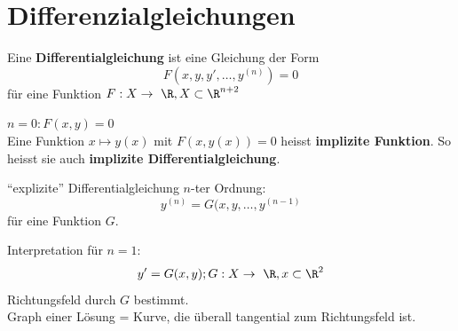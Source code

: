 \chapter{Differenzialgleichungen}
\begin{def*}[note = gewönliche Differentialgleichung $n$ter Ordnung , index = gewöhnliche Differentialgleichung , indexformat = {2!1~}]
	Eine \textbf{Differentialgleichung} ist eine Gleichung der Form
	\[ F( x , y , y' , \dotsc , y^{(n)} ) = 0 \]
	für eine Funktion $F : X \rightarrow \R , X \subset \R^{n+2}$
	
	$n=0 : F(x,y) = 0$ \\
	Eine Funktion $x \mapsto y(x)$ mit $F(x,y(x)) = 0$ heisst \textbf{implizite Funktion}. So heisst sie auch \textbf{implizite Differentialgleichung}.
	
	\enquote{explizite} Differentialgleichung $n$-ter Ordnung:
	\[ y^(n) = G( x , y , \dotsc , y^{(n-1)} \]
	für eine Funktion $G$.
\end{def*}
Interpretation für $n=1$: \\
\[ y' = G(x,y) ; G : X \rightarrow \R , x \subset \R^2 \]
Richtungsfeld durch $G$ bestimmt. \\
Graph einer Lösung = Kurve, die überall tangential zum Richtungsfeld ist.

